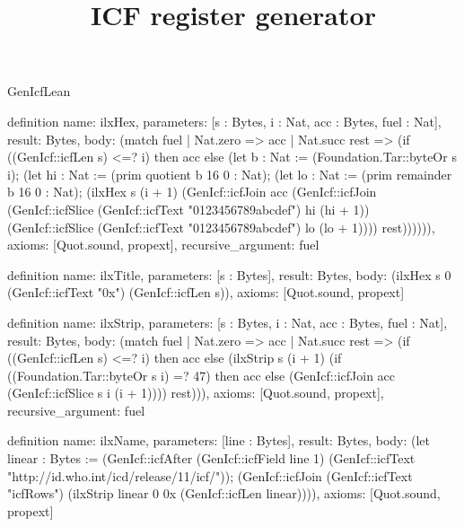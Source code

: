 \begin{lexlean}{GenIcfLean}
\title{ICF register generator}
\begin{semanticmodule}
definition{
  name: ilxHex,
  parameters: [s : Bytes, i : Nat, acc : Bytes, fuel : Nat],
  result: Bytes,
  body: (match fuel
    | Nat.zero => acc
    | Nat.succ rest => (if ((GenIcf::icfLen s) <=? i) then acc else (let b : Nat := (Foundation.Tar::byteOr s i); (let hi : Nat := (prim quotient b 16 0 : Nat); (let lo : Nat := (prim remainder b 16 0 : Nat); (ilxHex s (i + 1) (GenIcf::icfJoin acc (GenIcf::icfJoin (GenIcf::icfSlice (GenIcf::icfText "0123456789abcdef") hi (hi + 1)) (GenIcf::icfSlice (GenIcf::icfText "0123456789abcdef") lo (lo + 1)))) rest)))))),
  axioms: [Quot.sound, propext],
  recursive_argument: fuel
}

definition{
  name: ilxTitle,
  parameters: [s : Bytes],
  result: Bytes,
  body: (ilxHex s 0 (GenIcf::icfText "0x") (GenIcf::icfLen s)),
  axioms: [Quot.sound, propext]
}

definition{
  name: ilxStrip,
  parameters: [s : Bytes, i : Nat, acc : Bytes, fuel : Nat],
  result: Bytes,
  body: (match fuel
    | Nat.zero => acc
    | Nat.succ rest => (if ((GenIcf::icfLen s) <=? i) then acc else (ilxStrip s (i + 1) (if ((Foundation.Tar::byteOr s i) =? 47) then acc else (GenIcf::icfJoin acc (GenIcf::icfSlice s i (i + 1)))) rest))),
  axioms: [Quot.sound, propext],
  recursive_argument: fuel
}

definition{
  name: ilxName,
  parameters: [line : Bytes],
  result: Bytes,
  body: (let linear : Bytes := (GenIcf::icfAfter (GenIcf::icfField line 1) (GenIcf::icfText "http://id.who.int/icd/release/11/icf/")); (GenIcf::icfJoin (GenIcf::icfText "icfRows") (ilxStrip linear 0 0x (GenIcf::icfLen linear)))),
  axioms: [Quot.sound, propext]
}


\end{semanticmodule}
\end{lexlean}
